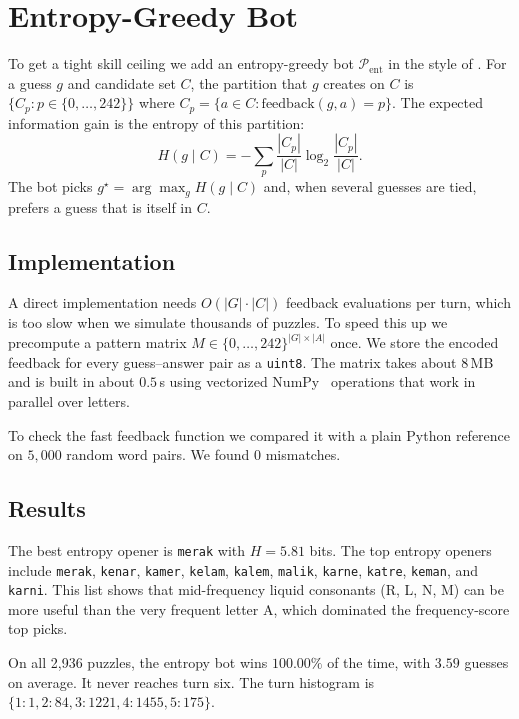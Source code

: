 \documentclass[conference]{IEEEtran}
\begin{document}
\section{Entropy-Greedy Bot}
\label{sec:entropy}

To get a tight skill ceiling we add an entropy-greedy bot
$\mathcal{P}_{\mathrm{ent}}$ in the style of \cite{3b1b_wordle}. For a
guess $g$ and candidate set $C$, the partition that $g$ creates on $C$
is $\{C_p : p \in \{0,\ldots,242\}\}$ where
$C_p = \{a \in C : \mathrm{feedback}(g,a) = p\}$. The expected
information gain is the entropy of this partition:
\begin{equation}
H(g \mid C) = -\sum_{p} \frac{|C_p|}{|C|} \log_2 \frac{|C_p|}{|C|}.
\end{equation}
The bot picks $g^\star = \arg\max_g H(g \mid C)$ and, when several
guesses are tied, prefers a guess that is itself in $C$.

\subsection{Implementation}

A direct implementation needs $O(|G| \cdot |C|)$ feedback evaluations
per turn, which is too slow when we simulate thousands of puzzles. To
speed this up we precompute a pattern matrix
$M \in \{0,\ldots,242\}^{|G| \times |A|}$ once. We store the encoded
feedback for every guess--answer pair as a \texttt{uint8}. The matrix
takes about $8\,$MB and is built in about $0.5\,$s using vectorized
NumPy~\cite{harris2020numpy} operations that work in parallel over
letters.

To check the fast feedback function we compared it with a plain Python
reference on $5{,}000$ random word pairs. We found 0 mismatches.

\subsection{Results}

The best entropy opener is \texttt{merak} with $H = 5.81$ bits. The top
entropy openers include \texttt{merak}, \texttt{kenar}, \texttt{kamer},
\texttt{kelam}, \texttt{kalem}, \texttt{malik}, \texttt{karne},
\texttt{katre}, \texttt{keman}, and \texttt{karni}. This list shows that mid-frequency
liquid consonants (R, L, N, M) can be more useful than the very frequent
letter A, which dominated the frequency-score top picks.

On all 2{,}936 puzzles, the entropy bot wins
\textbf{$100.00\%$} of the time, with $3.59$ guesses on average. It
never reaches turn six. The turn histogram is
$\{1: 1, 2: 84, 3: 1221, 4: 1455, 5: 175\}$.
\end{document}

